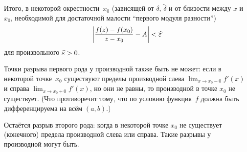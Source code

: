 \documentclass[a4paper,12pt]{article}
\begin{document}
\begin{remark}
{      Итого, в некоторой окрестности~$x_0$ (зависящей от $\delta$, $\widetilde\delta$ и от близости между $x$ и $x_0$, необходимой для достаточной малости ``первого модуля разности'')
      \[
        \left|\frac{f(z) - f(x_0)}{z - x_0} - A\right| < \widehat{\varepsilon}
      \]
      для произвольного $\widehat\eps \hm> 0$.
    }

    Точки разрыва первого рода у производной также быть не может: если в некоторой точке~$x_0$ существуют пределы производной слева $\lim_{x \to x_0 - 0} f'(x)$ и справа $\lim_{x \to x_0 + 0} f'(x)$, но они не равны, то производной в точке $x_0$ не существует.
    (Что противоречит тому, что по условию функция~$f$ должна быть дифференцируема на всём $(a, b)$.)

    Остаётся разрыв второго рода: когда в некоторой точке $x_0$ не существует (конечного) предела производной слева или справа.
    Такие разрывы у производной могут быть.
  \end{remark}
  
\end{document}
